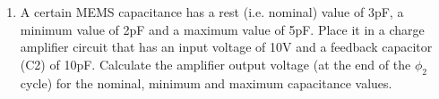 \documentclass{article}
\begin{document}
\begin{enumerate}
\begin{figure}[h]
\centering
\caption{ Values of Capacitance for (\ref{p1}).\\
		$d = 2\mu m \colon \Delta d = \pm1\mu m \colon \varepsilon = 8.854 pF/m$}
	\begin{subtable}[b]{0.3\textwidth}
		\centering
		\begin{tabular}{ l }
			$C = \frac{\varepsilon \times w \times L}{d - \Delta d}$\\
			$C = \frac{8.854 pF/m \times 1mm \times 1mm}{2\mu m - 1\mu m}$\\
			$C = 8.854pF$
		\end{tabular}
	  	\caption{Maximum: $d = d - \Delta d$}
	\end{subtable}
	\begin{subtable}[b]{0.3\textwidth}
		\centering
		\begin{tabular}{ l }
			$C = \frac{\varepsilon \times w \times L}{d}$\\
			$C = \frac{8.854 pF/m \times 1mm \times 1mm}{2\mu m}$\\
			$C = 4.427pF$
		\end{tabular}
		\caption{Nominal: $d = d$} 
	\end{subtable}
	\begin{subtable}[b]{0.3\textwidth}
		\centering
		\begin{tabular}{ l }
			$C = \frac{\varepsilon \times w \times L}{d - \Delta d}$\\
			$C = \frac{8.854 pF/m \times 1mm \times 1mm}{2\mu m + 1\mu m}$\\
			$C = 2.951pF$
		\end{tabular}
		\caption{Minimum: $d = d + \Delta d$}
	\end{subtable}
\end{figure}
\item\label{p2}
A certain MEMS capacitance has a rest (i.e. nominal) value of 3pF, a minimum
     value of 2pF and a maximum value of 5pF. Place it in a charge amplifier circuit
     that has an input voltage of 10V and a feedback capacitor (C2) of 10pF. Calculate
     the amplifier output voltage (at the end of the $\phi_2$ cycle) for the nominal, minimum
     and maximum capacitance values.\\


\end{enumerate}
\end{document}
